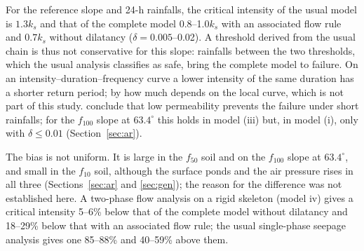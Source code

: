For the reference slope and 24-h rainfalls, the critical intensity of the usual model is $1.3k_s$ and that of the
complete model 0.8--1.0$k_s$ with an associated flow rule and $0.7k_s$ without dilatancy ($\delta=0.005$--0.02).
A threshold derived from the usual chain is thus not conservative for this slope: rainfalls between the two
thresholds, which the usual analysis classifies as safe, bring the complete model to failure. On an
intensity--duration--frequency curve a lower intensity of the same duration has a shorter return period; by how much
depends on the local curve, which is not part of this study. \citet[p.~1541]{rahardjo2007} conclude that low
permeability prevents the failure under short rainfalls; for the $f_{100}$ slope at $63.4^\circ$ this holds in model
(iii) but, in model (i), only with $\delta\le0.01$ (Section~\ref{sec:ar}).

The bias is not uniform. It is large in the $f_{50}$ soil and on the $f_{100}$ slope at $63.4^\circ$, and small in
the $f_{10}$ soil, although the surface ponds and the air pressure rises in all three (Sections~\ref{sec:ar} and
\ref{sec:gen}); the reason for the difference was not established here. A two-phase flow analysis on a rigid skeleton
(model iv) gives a critical intensity 5--6\% below that of the complete model without dilatancy and
18--29\% below that with an associated flow rule; the usual single-phase seepage analysis gives one 85--88\% and
40--59\% above them.
